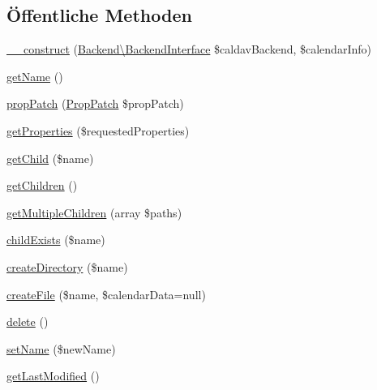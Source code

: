 \subsection*{Öffentliche Methoden}
\begin{DoxyCompactItemize}
\item 
\mbox{\hyperlink{class_sabre_1_1_cal_d_a_v_1_1_calendar_ab7922758f8fde9d3e2cb60625013bb30}{\+\_\+\+\_\+construct}} (\mbox{\hyperlink{interface_sabre_1_1_cal_d_a_v_1_1_backend_1_1_backend_interface}{Backend\textbackslash{}\+Backend\+Interface}} \$caldav\+Backend, \$calendar\+Info)
\item 
\mbox{\hyperlink{class_sabre_1_1_cal_d_a_v_1_1_calendar_ab6aa53fc6718604840c91f6842573382}{get\+Name}} ()
\item 
\mbox{\hyperlink{class_sabre_1_1_cal_d_a_v_1_1_calendar_ac0dbb7fd0a45e725bfbe0cebdadf92e7}{prop\+Patch}} (\mbox{\hyperlink{class_sabre_1_1_d_a_v_1_1_prop_patch}{Prop\+Patch}} \$prop\+Patch)
\item 
\mbox{\hyperlink{class_sabre_1_1_cal_d_a_v_1_1_calendar_a44acbaebc3c3374606e67011a09c6685}{get\+Properties}} (\$requested\+Properties)
\item 
\mbox{\hyperlink{class_sabre_1_1_cal_d_a_v_1_1_calendar_a79a4bc9d8be2331ab1891ace08a13a9a}{get\+Child}} (\$name)
\item 
\mbox{\hyperlink{class_sabre_1_1_cal_d_a_v_1_1_calendar_a438e79532992b4da02ed17df296a9346}{get\+Children}} ()
\item 
\mbox{\hyperlink{class_sabre_1_1_cal_d_a_v_1_1_calendar_a9f26acb24cd7aa4059efc96489337a0b}{get\+Multiple\+Children}} (array \$paths)
\item 
\mbox{\hyperlink{class_sabre_1_1_cal_d_a_v_1_1_calendar_a12d080fe5176db762382268f40f70c0f}{child\+Exists}} (\$name)
\item 
\mbox{\hyperlink{class_sabre_1_1_cal_d_a_v_1_1_calendar_a3b7a4211a2077bce91c8e369b35279d7}{create\+Directory}} (\$name)
\item 
\mbox{\hyperlink{class_sabre_1_1_cal_d_a_v_1_1_calendar_a5aefe3eda08406957905a989a95cde5d}{create\+File}} (\$name, \$calendar\+Data=null)
\item 
\mbox{\hyperlink{class_sabre_1_1_cal_d_a_v_1_1_calendar_a0bfee16a5eea26ac932eefdd0f7ca380}{delete}} ()
\item 
\mbox{\hyperlink{class_sabre_1_1_cal_d_a_v_1_1_calendar_a4ed32462bdf6e4bfcefeff3349db7ba0}{set\+Name}} (\$new\+Name)
\item 
\mbox{\hyperlink{class_sabre_1_1_cal_d_a_v_1_1_calendar_a8edaf2f01edea7d84f31ef0500ce54ea}{get\+Last\+Modified}} ()

\end{DoxyCompactItemize}

